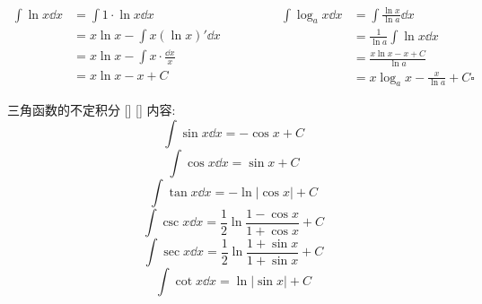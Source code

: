 \documentclass[UTF8]{ctexart}
\begin{document}
			\begin{prf}
				\[
				\begin{aligned}
					\int\ln x\dd x
					& = \int 1\cdot\ln x\dd x\\
					& = x\ln x-\int x(\ln x)'\dd x\\
					& = x\ln x-\int x\cdot\frac{\dd x}{x}\\
					& = x\ln x-x+C\\					
				\end{aligned}
				\qquad\qquad
				\begin{aligned}
					\int\log_a x\dd x
					& = \int\frac{\ln x}{\ln a}\dd x\\
					& = \frac{1}{\ln a}\int\ln x\dd x\\
					& = \frac{x\ln x-x+C}{\ln a}\\
					& = x\log_a x-\frac{x}{\ln a}+C\square
				\end{aligned}\]
			\end{prf}
			
			\begin{xmp}
			    []
			    {三角函数的不定积分}
			    []
			    []
				内容: 
				\[\int\sin x\dd x=-\cos x+C\]
				\[\int\cos x\dd x=\sin x+C\]
				\[\int\tan x\dd x=-\ln|\cos x|+C\]
				\[\int\csc x\dd x=\frac{1}{2}\ln\frac{1-\cos x}{1+\cos x}+C\]
				\[\int\sec x\dd x=\frac{1}{2}\ln\frac{1+\sin x}{1+\sin x}+C\]
				\[\int\cot x\dd x=\ln|\sin x|+C\]
			\end{xmp}
				
\end{document}
